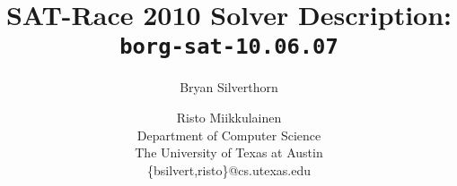 \documentclass[letterpaper]{article}
\title{SAT-Race 2010 Solver Description: {\tt borg-sat-10.06.07}}
\author{Bryan Silverthorn \and Risto Miikkulainen\\
Department of Computer Science\\
The University of Texas at Austin\\
\{bsilvert,risto\}@cs.utexas.edu}
\begin{document}
\nocopyright
\maketitle









\end{document}
